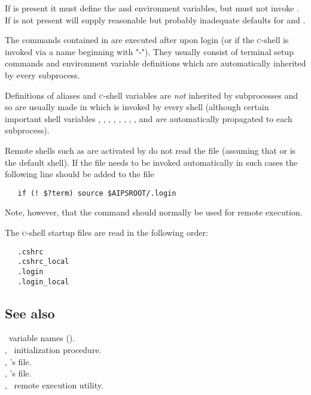 If  is present it must define the  and
 environment variables, but must not invoke .
If  is not present  will supply reasonable
but probably inadequate defaults for  and .

The commands contained in  are executed after  upon
login (or if the \textsc{c}-shell is invoked via a name beginning with "-").
They usually consist of terminal setup commands and environment variable
definitions which are automatically inherited by every subprocess.

Definitions of aliases and \textsc{c}-shell variables are {\em not} inherited
by subprocesses and so are usually made in  which is invoked by
every shell (although certain important shell variables ,
, , , , ,
, , and  {\em are} automatically
propagated to each subprocess).

Remote shells such as are activated by  do not read the
 file (assuming that  or  is the
default shell).  If the  file needs to be invoked automatically
in such cases the following line should be added to the 
file

\begin{verbatim}
   if (! $?term) source $AIPSROOT/.login
\end{verbatim}

\noindent
Note, however, that the  command should normally be used for
remote execution.

The \textsc{c}-shell startup files are read in the following order:

\begin{verbatim}
   .cshrc
   .cshrc_local
   .login
   .login_local
\end{verbatim}

\subsection*{See also}

\aipspp\ variable names ().\\
, \aipspp\ initialization procedure.\\
, 's  file.\\
, 's  file.\\
, \aipspp\ remote execution utility.

